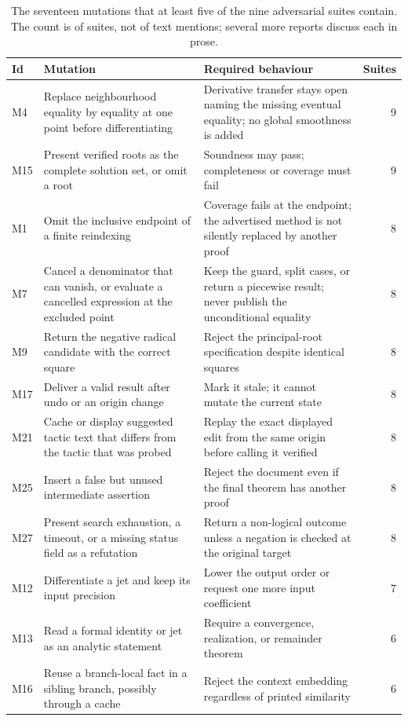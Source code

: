 \documentclass[11pt,a4paper]{article}
\theoremstyle{definition}
\begin{document}
\begin{table}[htbp]
\centering\small
\caption{The seventeen mutations that at least five of the nine adversarial suites contain. The count is of suites, not of text mentions; several more reports discuss each in prose.}
\label{tab:suite}
\begin{tabularx}{\textwidth}{@{}L{8mm}YL{58mm}r@{}}
\toprule
Id & Mutation & Required behaviour & Suites\\
\midrule
M4 & Replace neighbourhood equality by equality at one point before differentiating & Derivative transfer stays open naming the missing eventual equality; no global smoothness is added & 9\\
M15 & Present verified roots as the complete solution set, or omit a root & Soundness may pass; completeness or coverage must fail & 9\\
M1 & Omit the inclusive endpoint of a finite reindexing & Coverage fails at the endpoint; the advertised method is not silently replaced by another proof & 8\\
M7 & Cancel a denominator that can vanish, or evaluate a cancelled expression at the excluded point & Keep the guard, split cases, or return a piecewise result; never publish the unconditional equality & 8\\
M9 & Return the negative radical candidate with the correct square & Reject the principal-root specification despite identical squares & 8\\
M17 & Deliver a valid result after undo or an origin change & Mark it stale; it cannot mutate the current state & 8\\
M21 & Cache or display suggested tactic text that differs from the tactic that was probed & Replay the exact displayed edit from the same origin before calling it verified & 8\\
M25 & Insert a false but unused intermediate assertion & Reject the document even if the final theorem has another proof & 8\\
M27 & Present search exhaustion, a timeout, or a missing status field as a refutation & Return a non-logical outcome unless a negation is checked at the original target & 8\\
M12 & Differentiate a jet and keep its input precision & Lower the output order or request one more input coefficient & 7\\
M13 & Read a formal identity or jet as an analytic statement & Require a convergence, realization, or remainder theorem & 6\\
M16 & Reuse a branch-local fact in a sibling branch, possibly through a cache & Reject the context embedding regardless of printed similarity & 6\\

\end{tabularx}
\end{table}
\end{document}
